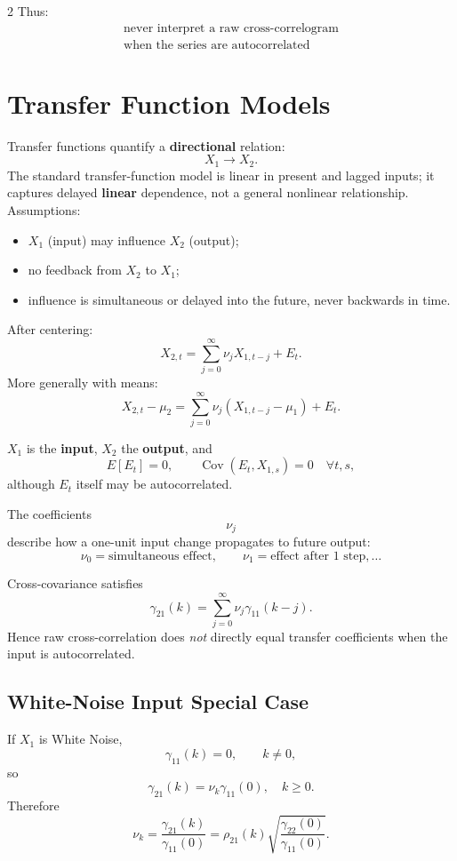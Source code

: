 \documentclass[9pt,a4paper]{extarticle}
\newcommand{\key}[1]{\textbf{#1}}
\begin{document}
\begin{multicols}{2}
Thus:
\[
\boxed{\begin{array}{c}
\text{never interpret a raw cross-correlogram}\\
\text{when the series are autocorrelated}
\end{array}}
\]

\section{Transfer Function Models}

Transfer functions quantify a \key{directional} relation:
\[
X_1\longrightarrow X_2.
\]
The standard transfer-function model is linear in present and lagged inputs; it captures delayed \key{linear} dependence, not a general nonlinear relationship.
Assumptions:
\begin{itemize}
\item \(X_1\) (input) may influence \(X_2\) (output);
\item no feedback from \(X_2\) to \(X_1\);
\item influence is simultaneous or delayed into the future, never backwards in time.
\end{itemize}

After centering:
\[
\boxed{
X_{2,t}
=
\sum_{j=0}^{\infty}
\nu_jX_{1,t-j}
+E_t.
}
\]
More generally with means:
\[
X_{2,t}-\mu_2
=
\sum_{j=0}^{\infty}
\nu_j(X_{1,t-j}-\mu_1)+E_t.
\]

\(X_1\) is the \key{input}, \(X_2\) the \key{output}, and
\[
E[E_t]=0,\qquad
\operatorname{Cov}(E_t,X_{1,s})=0\quad\forall t,s,
\]
although \(E_t\) itself may be autocorrelated.

The coefficients
\[
\boxed{\nu_j}
\]
describe how a one-unit input change propagates to future output:
\[
\nu_0=\text{simultaneous effect},\qquad
\nu_1=\text{effect after 1 step},\ldots
\]

Cross-covariance satisfies
\[
\boxed{
\gamma_{21}(k)
=
\sum_{j=0}^{\infty}
\nu_j\gamma_{11}(k-j).
}
\]
Hence raw cross-correlation does \emph{not} directly equal transfer coefficients when the input is autocorrelated.

\subsection{White-Noise Input Special Case}

If \(X_1\) is White Noise,
\[
\gamma_{11}(k)=0,\qquad k\neq0,
\]
so
\[
\boxed{
\gamma_{21}(k)=\nu_k\gamma_{11}(0),\quad k\ge0.
}
\]
Therefore
\[
\boxed{
\nu_k=
\frac{\gamma_{21}(k)}{\gamma_{11}(0)}
=
\rho_{21}(k)
\sqrt{\frac{\gamma_{22}(0)}{\gamma_{11}(0)}}.
}
\]


\end{multicols}
\end{document}
